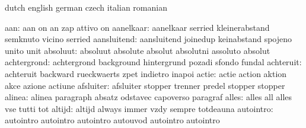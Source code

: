

\startvariables            dutch                     english
                           german                    czech
                           italian                   romanian

                      aan: aan                       on
                           an                        zap
                           attivo                    on
                aanelkaar: aanelkaar                 serried
                           kleinerabstand            semknuto
                           vicino                    serried
              aansluitend: aansluitend               joinedup
                           keinabstand               spojeno
                           unito                     unit
                 absoluut: absoluut                  absolute
                           absolut                   absolutni
                           assoluto                  absolut
              achtergrond: achtergrond               background
                           hintergrund               pozadi
                           sfondo                    fundal
                achteruit: achteruit                 backward
                           rueckwaerts               zpet
                           indietro                  inapoi
                    actie: actie                     action
                           aktion                    akce
                           azione                    actiune
                afsluiter: afsluiter                 stopper
                           trenner                   predel
                           stopper                   stopper
                   alinea: alinea                    paragraph
                           absatz                    odstavec
                           capoverso                 paragraf
                    alles: alles                     all
                           alles                     vse
                           tutti                     tot
                   altijd: altijd                    always
                           immer                     vzdy
                           sempre                    totdeauna
                autointro: autointro                 autointro
                           autointro                 autouvod
                           autointro                 autointro
